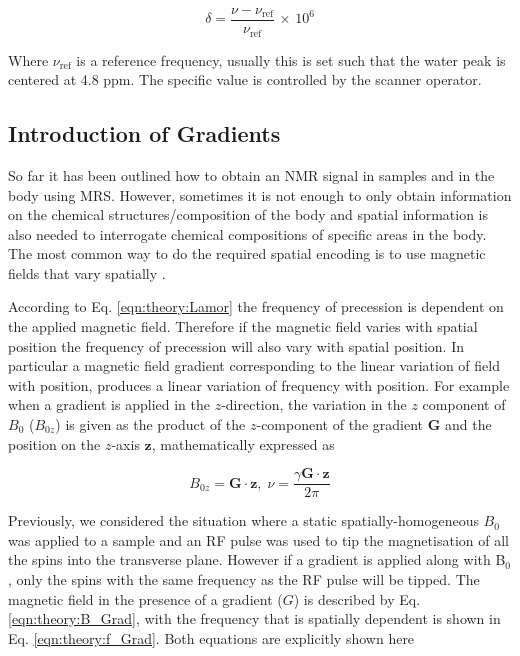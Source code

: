 \begin{equation}
    \delta = \frac{\nu - \nu_{\textrm{ref}}}{\nu_\textrm{ref}} \, \times \, 10^6
    \label{eqn:theory:chemshift}
\end{equation}

Where $\nu_{\textrm{ref}}$ is a reference frequency, usually this is set such that the water peak is centered at 4.8 ppm. The specific value is controlled by the scanner operator.  

\subsection{Introduction of Gradients}

So far it has been outlined how to obtain an \ac{NMR} signal in samples and in the body using MRS. However, sometimes it is not enough to only obtain information on the chemical structures/composition of the body and spatial information is also needed to interrogate chemical compositions of specific areas in the body. The most common way to do the required spatial encoding is to use magnetic fields that vary spatially \cite{Haacke2014MagneticDesign}. 

According to Eq. \ref{eqn:theory:Lamor} the frequency of precession is dependent on the applied magnetic field. Therefore if the magnetic field varies with spatial position the frequency of precession will also vary with spatial position. In particular a magnetic field gradient corresponding to the linear variation of field with position, produces a linear variation of frequency with position. For example when a gradient is applied in the $z$-direction, the variation in the $z$ component of $B_0$ ($B_{0z}$) is given as the product of the $z$-component of the gradient $\mathbf{G}$ and the position on the $z$-axis $\mathbf{z}$, mathematically expressed as

\begin{equation}
    B_{0z} = \mathbf{G}\cdot \mathbf{z},\; \nu = \frac{\gamma \mathbf{G} \cdot \mathbf{z}}{2\pi} 
\end{equation}

Previously, we considered the situation where a static spatially-homogeneous $B_0$ was applied to a sample and an \ac{RF} pulse was used to tip the magnetisation of all the spins into the transverse plane. However if a gradient is applied along with B$_0$, only the spins with the same frequency as the \ac{RF} pulse will be tipped. The magnetic field in the presence of a gradient ($G$) is described by Eq. \ref{eqn:theory:B_Grad}, with the frequency that is spatially dependent is shown in Eq. \ref{eqn:theory:f_Grad}. Both equations are explicitly shown here

